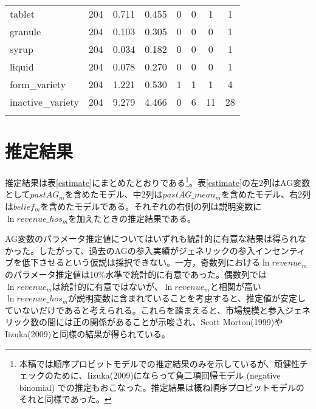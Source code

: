 \documentclass[a4j,10.5pt]{jarticle}
\begin{document}
\begin{table}[!htbp]
\begin{tabular}{@{\extracolsep{5pt}}lccccccc}
        tablet & 204 & 0.711 & 0.455 & 0 & 0 & 1 & 1 \\ 
        granule & 204 & 0.103 & 0.305 & 0 & 0 & 0 & 1 \\ 
        syrup & 204 & 0.034 & 0.182 & 0 & 0 & 0 & 1 \\ 
        liquid & 204 & 0.078 & 0.270 & 0 & 0 & 0 & 1 \\ 
        form\_variety & 204 & 1.221 & 0.530 & 1 & 1 & 1 & 4 \\ 
        inactive\_variety & 204 & 9.279 & 4.466 & 0 & 6 & 11 & 28 \\ 
        \hline \\[-1.8ex] 
    \end{tabular} 
\end{table}

\section{推定結果}
推定結果は表\ref{estimate}にまとめたとおりである\footnote{本稿では順序プロビットモデルでの推定結果のみを示しているが、頑健性チェックのために、Iizuka(2009)にならって負二項回帰モデル (negative binomial) での推定もおこなった。推定結果は概ね順序プロビットモデルのそれと同様であった。}。表\ref{estimate}の左2列はAG変数として$pastAG_m$を含めたモデル、中2列は$pastAG\_mean_m$を含めたモデル、右2列は$belief_m$を含めたモデルである。それぞれの右側の列は説明変数に$\ln revenue\_hos_m$を加えたときの推定結果である。\par
AG変数のパラメータ推定値についてはいずれも統計的に有意な結果は得られなかった。したがって、過去のAGの参入実績がジェネリックの参入インセンティブを低下させるという仮説は採択できない。一方，奇数列における$\ln revenue_m$のパラメータ推定値は10\%水準で統計的に有意であった。偶数列では$\ln revenue_m$は統計的に有意ではないが、$\ln revenue_m$と相関が高い$\ln revenue\_hos_m$が説明変数に含まれていることを考慮すると、推定値が安定していないだけであると考えられる。これらを踏まえると、市場規模と参入ジェネリック数の間には正の関係があることが示唆され、Scott Morton(1999)やIizuka(2009)と同様の結果が得られている。
\end{document}
